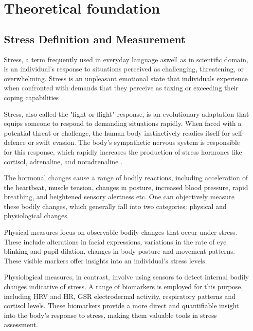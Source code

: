 \chapter{Theoretical foundation}

\section{Stress Definition and Measurement}
Stress, a term frequently used in everyday language aswell as in scientific domain, is an individual's response to situations perceived as challenging, threatening, or overwhelming. Stress is an unpleasant emotional state that individuals experience when confronted with demands that they perceive as taxing or exceeding their coping capabilities \parencite{stress2}.

Stress, also called the "fight-or-flight" response, is an evolutionary adaptation that equips someone to respond to demanding situations rapidly. When faced with a potential threat or challenge, the human body instinctively readies itself for self-defence or swift evasion. The body's sympathetic nervous system is responsible for this response, which rapidly increases the production of stress hormones like cortisol, adrenaline, and noradrenaline \parencite{1}.

The hormonal changes cause a range of bodily reactions, including acceleration of the heartbeat, muscle tension, changes in posture, increased blood pressure, rapid breathing, and heightened sensory alertness etc. One can objectively measure these bodily changes, which generally fall into two categories: physical and physiological changes.

Physical measures focus on observable bodily changes that occur under stress. These include alterations in facial expressions, variations in the rate of eye blinking and pupil dilation, changes in body posture and movement patterns. These visible markers offer insights into an individual's stress levels.

Physiological measures, in contrast, involve using sensors to detect internal bodily changes indicative of stress. A range of biomarkers is employed for this purpose, including \gls{HRV}  and \gls{HR}, \gls{GSR} electrodermal activity, respiratory patterns and cortisol levels. These biomarkers provide a more direct and quantifiable insight into the body's response to stress, making them valuable tools in stress assessment.

